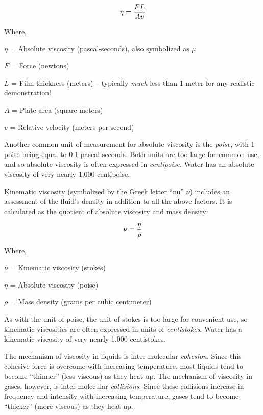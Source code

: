 $$\eta = {FL \over Av}$$

\noindent
Where,

$\eta$ = Absolute viscosity (pascal-seconds), also symbolized as $\mu$ 

$F$ = Force (newtons)

$L$ = Film thickness (meters) -- typically \textit{much} less than 1 meter for any realistic demonstration!

$A$ = Plate area (square meters)

$v$ = Relative velocity (meters per second)

\vskip 10pt

Another common unit of measurement for absolute viscosity is the \textit{poise}, with 1 poise being equal to 0.1 pascal-seconds.  Both units are too large for common use, and so absolute viscosity is often expressed in \textit{centipoise}.  Water has an absolute viscosity of very nearly 1.000 centipoise.  

\vskip 10pt

\filbreak

Kinematic viscosity (symbolized by the Greek letter ``nu'' $\nu$) includes an assessment of the fluid's density in addition to all the above factors.  It is calculated as the quotient of absolute viscosity and mass density:

$$\nu = {\eta \over \rho}$$

\noindent
Where,

$\nu$ = Kinematic viscosity (stokes)

$\eta$ = Absolute viscosity (poise)

$\rho$ = Mass density (grams per cubic centimeter)

\vskip 10pt

As with the unit of poise, the unit of stokes is too large for convenient use, so kinematic viscosities are often expressed in units of \textit{centistokes}.  Water has a kinematic viscosity of very nearly 1.000 centistokes.  

\vskip 10pt

The mechanism of viscosity in liquids is inter-molecular \textit{cohesion}.  Since this cohesive force is overcome with increasing temperature, most liquids tend to become ``thinner'' (less viscous) as they heat up.  The mechanism of viscosity in gases, however, is inter-molecular \textit{collisions}.  Since these collisions increase in frequency and intensity with increasing temperature, gases tend to become ``thicker'' (more viscous) as they heat up. 

